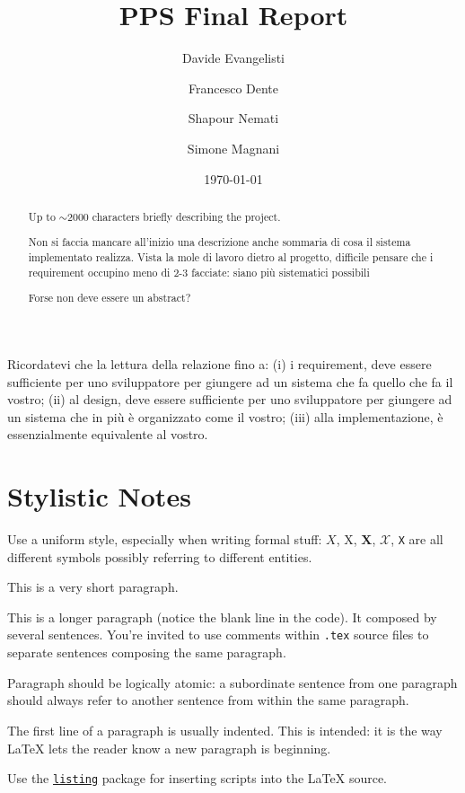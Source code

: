 \documentclass{scrartcl}
\title{\LARGE
    PPS Final Report
}
\author{
    Davide Evangelisti \\ \emailaddr{davide.evangelisti2@studio.unibo.it}
    \and 
    Francesco Dente \\ \emailaddr{francesco.dente@studio.unibo.it} 
    \and 
    Shapour Nemati \\ \emailaddr{shapour.nemati@studio.unibo.it}
    \and 
    Simone Magnani \\ \emailaddr{simone.magnani4@studio.unibo.it} 
    
}
\date{\today}
\begin{document}
\maketitle

Ricordatevi che la lettura della relazione fino a: (i) i requirement, deve essere sufficiente per uno sviluppatore per giungere ad un sistema che fa quello che fa il vostro; (ii) al design, deve essere sufficiente per uno sviluppatore per giungere ad un sistema che in più è organizzato come il vostro; (iii) alla implementazione, è essenzialmente equivalente al vostro.

\begin{abstract}
    Up to $\sim$2000 characters briefly describing the project.
    
    Non si faccia mancare all'inizio una descrizione anche sommaria di cosa il sistema implementato realizza.
Vista la mole di lavoro dietro al progetto, difficile pensare che i requirement occupino meno di 2-3 facciate: siano più sistematici possibili


Forse non deve essere un abstract?
\end{abstract}













\section*{Stylistic Notes}

Use a uniform style, especially when writing formal stuff: $X$, X, $\mathbf{X}$, $\mathcal{X}$, \texttt{X} are all different symbols possibly referring to different entities. 

This is a very short paragraph.

This is a longer paragraph (notice the blank line in the code).
It composed by several sentences.
%
You're invited to use comments within \texttt{.tex} source files to separate sentences composing the same paragraph.

Paragraph should be logically atomic: a subordinate sentence from one paragraph should always refer to another sentence from within the same paragraph.

The first line of a paragraph is usually indented.
%
This is intended: it is the way \LaTeX{} lets the reader know a new paragraph is beginning.

Use the \href{https://en.wikibooks.org/wiki/LaTeX/Source_Code_Listings}{\texttt{listing}} package for inserting scripts into the \LaTeX{} source.

\nocite{*} %


\end{document}
